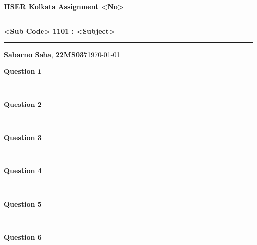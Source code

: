 \documentclass[addpoints]{exam}
\begin{document}
\par\textbf{IISER Kolkata} \hfill \textbf{Assignment <No>}
\vspace{3pt}
\hrule
\vspace{3pt}
\begin{center}
        \LARGE{\textbf{<Sub Code> 1101 : <Subject>}}
\end{center}
\vspace{3pt}

\hrule
\vspace{4pt}
\textbf{Sabarno Saha}, \textbf{22MS037}\hfill \today

\vspace{20pt}

\bigskip

\begin{questions}

\question \textbf{ Question 1}

\begin{solution}\\
 
\end{solution}

\question \textbf{ Question 2}

\begin{solution}\\
 
\end{solution}

\question \textbf{ Question 3}

\begin{solution}\\
 
\end{solution}

\question \textbf{ Question 4}

\begin{solution}\\
 
\end{solution}


\question \textbf{ Question 5}

\begin{solution}\\
 
\end{solution}

\question \textbf{ Question 6}

\begin{solution}\\
 

\end{solution}
\end{questions}
\end{document}
